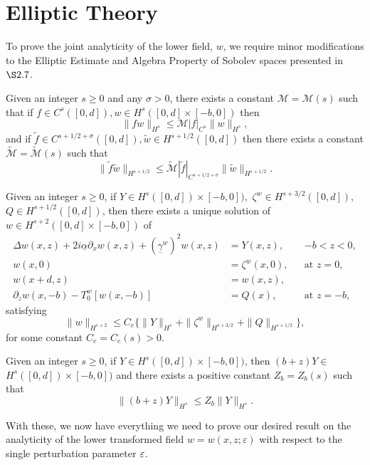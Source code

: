\section{Elliptic Theory}
\label{intro:elliptic_theory}

To prove the joint analyticity of the lower field, $w$, we require minor modifications to the Elliptic Estimate and Algebra Property of Sobolev spaces presented in $\S 2.7$.
\vskip 0.1in
\begin{lemma}
Given an integer $s \ge 0$ and any $\sigma > 0$, there exists a constant $\mathcal{M}=\mathcal{M}(s)$ such that if $f\in C^s([0,d]),w\in H^s([0,d]\times [-b,0])$ then
\begin{equation}
\|fw\|_{H^s} \le \mathcal{M}|f|_{C^s}\|w\|_{H^s},
\end{equation}
and if $\tilde{f}\in C^{s+1/2+\sigma}([0,d]),\tilde{w}\in H^{s+1/2}([0,d])$ then there exists a constant $\tilde{\mathcal{M}}=\tilde{\mathcal{M}}(s)$ such that
\begin{equation}
 \|\tilde{f}\tilde{w}\|_{H^{s+1/2}} \le \tilde{\mathcal{M}}|\tilde{f}|_{C^{s+1/2+\sigma}}\|\tilde{w}\|_{H^{s+1/2}}.   
\end{equation}
\end{lemma}
\vskip 0.1in
\begin{theorem}
Given an integer $s\ge 0$, if $Y\in H^s([0,d])\times [-b,0]),$ $\zeta^w \in H^{s+3/2}([0,d]),$ $Q\in H^{s+1/2}([0,d])$, then there exists a unique solution of $w\in H^{s+2}([0,d]\times [-b,0])$ of
\begin{subequations}
\begin{align}
\Delta w(x,z) +2i\underline{\alpha}\partial_{x}w(x,z)+(\underline{\gamma}^w)^2w(x,z)&=Y(x,z), && \text{$-b<z<0$},\\
w(x,0)&=\zeta^w(x,0), && \text{at $z=0$},\\
w(x+d,z)&=w(x,z),\\
\partial_z w(x,-b)-T_0^w[w(x,-b)] &= Q(x), && \text{at $z=-b$},
\end{align}
\end{subequations}
satisfying
\begin{equation}\|w\|_{H^{s+2}}\le C_e\{\|Y\|_{H^{s}}+\|\zeta^w\|_{H^{s+3/2}}+\|Q\|_{H^{s+1/2}}  \}, \end{equation}
for some constant $C_e = C_e(s) > 0$.
\end{theorem}
\vskip 0.1in
\begin{lemma}
Given an integer $s\ge 0$, if $Y\in H^s([0,d])\times [-b,0])$, then $(b+z)Y \in$ $H^s([0,d])\times [-b,0])$ and there exists a positive constant $Z_b = Z_b(s)$ such that
$$\|(b+z)Y\|_{H^s} \le Z_b \|Y\|_{H^s}.$$
\end{lemma}
\hspace{-6mm}With these, we now have everything we need to prove our desired result on the analyticity of the lower transformed field $w=w(x,z;\varepsilon)$ with respect to the single perturbation parameter $\varepsilon$.



